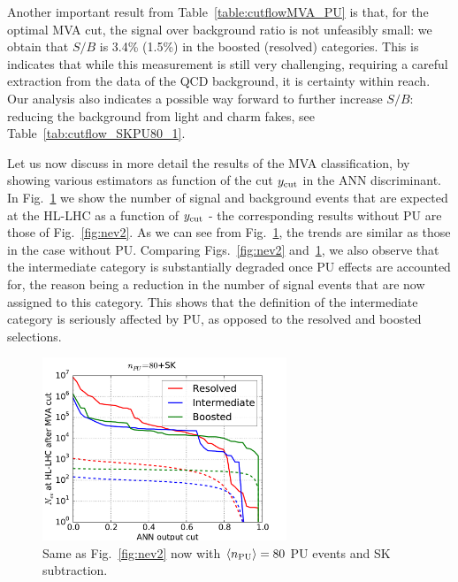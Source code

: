 Another important result from Table~\ref{table:cutflowMVA_PU} is that,
for the optimal MVA cut, the signal over background ratio
is not unfeasibly small: we obtain that $S/B$ is 3.4\% (1.5\%)
in the boosted (resolved) categories.
%
This is indicates that while this measurement is still very challenging,
requiring a careful extraction from the data of the QCD
background, it is certainty within reach.
%
Our analysis also indicates a possible way forward to
further increase $S/B$: reducing the background from light and charm
fakes, see Table~\ref{tab:cutflow_SKPU80_1}.

Let us now discuss in more detail the results of the MVA
classification, by showing various estimators as function
of the cut $y_{\rm cut}$ in the ANN discriminant.
%
In Fig.~\ref{fig:nev2_PU}
we show the number of signal and background events that
are expected at the HL-LHC as a function of
$y_{\rm cut}$ -
the corresponding results without PU are those of
Fig.~\ref{fig:nev2}.
%
As we can see from Fig.~\ref{fig:nev2_PU}, the trends are
similar as those in the case without PU.
%
Comparing Figs.~\ref{fig:nev2} and~\ref{fig:nev2_PU}, we also observe
that the intermediate category is substantially degraded once PU effects
are accounted for, the reason being a reduction in the number of signal
events that are now assigned to this category.
%
This shows that the definition of the intermediate category is seriously
affected by PU, as opposed to the resolved and boosted selections.

\begin{figure}[t]
\begin{center}
\includegraphics[width=0.65\textwidth]{plots/nev2_SKPU80.pdf}
\caption{\small Same as Fig.~\ref{fig:nev2} now
  with  $\left\langle n_{\rm PU}\right\rangle=80$ PU events 
  and SK subtraction.
}
\label{fig:nev2_PU}
\end{center}
\end{figure}


